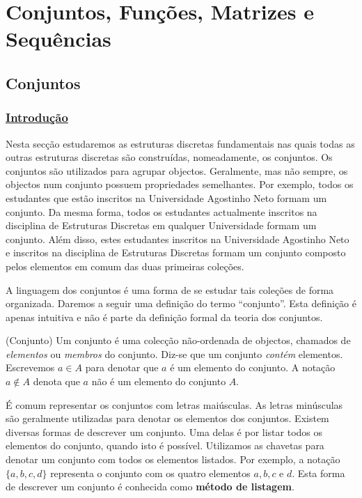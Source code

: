 \chapter{Conjuntos, Funções, Matrizes e Sequências}%
\label{cap:conjuntos}

\section{Conjuntos}
\label{sec31}

\subsection*{\underline{Introdução}}

Nesta secção estudaremos as estruturas discretas fundamentais nas quais todas as
outras estruturas discretas são construídas, nomeadamente, os conjuntos. Os
conjuntos são utilizados para agrupar objectos. Geralmente, mas não sempre, os
objectos num conjunto possuem propriedades semelhantes. Por exemplo, todos os
estudantes que estão inscritos na Universidade Agostinho Neto formam um
conjunto. Da mesma forma, todos os estudantes actualmente inscritos na
disciplina de Estruturas Discretas em qualquer Universidade formam um conjunto. Além disso, estes
estudantes inscritos na Universidade Agostinho Neto e inscritos na disciplina de
Estruturas Discretas formam um conjunto composto pelos elementos em comum
das duas primeiras coleções.

A linguagem dos conjuntos é uma forma de se estudar tais coleções de forma
organizada. Daremos a seguir uma definição do termo ``conjunto''. Esta definição
é apenas intuitiva e não é parte da definição formal da teoria dos conjuntos.

\label{def31}
\begin{defn}
(Conjunto) Um conjunto é uma colecção não-ordenada de objectos, chamados de
\emph{elementos} ou \emph{membros} do conjunto. Diz-se que um conjunto
\emph{contém} elementos. Escrevemos $a \in A$ para denotar que $a$ é um
elemento do conjunto. A notação $a \notin A$ denota que $a$ não é um elemento
do conjunto $A$.
\end{defn}


É comum representar os conjuntos com letras maiúsculas. As letras minúsculas são
geralmente utilizadas para denotar os elementos dos conjuntos. Existem diversas
formas de descrever um conjunto. Uma delas é por listar todos os elementos do
conjunto, quando isto é possível. Utilizamos as chavetas para denotar um
conjunto com todos os elementos listados. Por exemplo, a notação $\{a,b,c,d\}$
representa o conjunto com os quatro elementos $a,b,c$ e $d$. Esta forma de
descrever um conjunto é conhecida como \textbf{método de listagem}.

